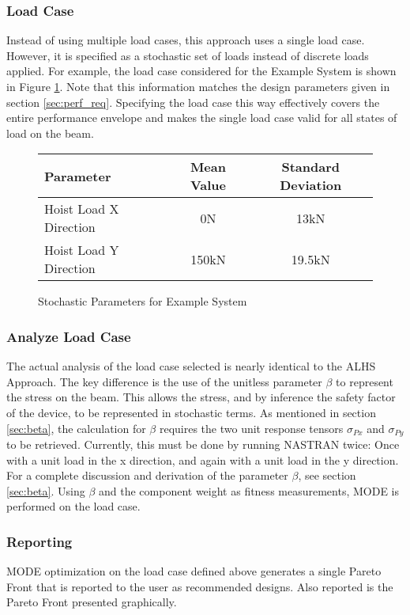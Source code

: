 \subsubsection{Load Case}
Instead of using multiple load cases, this approach uses a single load case. However, it is specified as a stochastic set of loads instead of discrete loads applied. For example, the load case considered for the Example System is shown in Figure \ref{fig:stoch_params}. Note that this information matches the design parameters given in section \ref{sec:perf_req}. Specifying the load case this way effectively covers the entire performance envelope and makes the single load case valid for all states of load on the beam. 

\begin{figure}[!h]
    \begin{center}
    \begin{tabular}{|l|cc|}
	    \hline
	    Parameter & Mean Value & Standard Deviation\\
	    \hline
	    Hoist Load X Direction & 0N & 13kN\\
	    Hoist Load Y Direction & 150kN & 19.5kN\\
	    \hline
    \end{tabular}
    \caption{Stochastic Parameters for Example System}
    \label{fig:stoch_params}
    \end{center}
\end{figure}

\subsubsection{Analyze Load Case}
The actual analysis of the load case selected is nearly identical to the ALHS Approach. The key difference is the use of the unitless parameter $\beta$ to represent the stress on the beam. This allows the stress, and by inference the safety factor of the device, to be represented in stochastic terms. As mentioned in section \ref{sec:beta}, the calculation for $\beta$ requires the two unit response tensors $\sigma_{Px}$ and $\sigma_{Py}$ to be retrieved. Currently, this must be done by running NASTRAN twice: Once with a unit load in the x direction, and again with a unit load in the y direction. For a complete discussion and derivation of the parameter $\beta$, see section \ref{sec:beta}. Using $\beta$ and the component weight as fitness measurements, MODE is performed on the load case.

\subsubsection{Reporting}
MODE optimization on the load case defined above generates a single Pareto Front that is reported to the user as recommended designs. Also reported is the Pareto Front presented graphically. 
